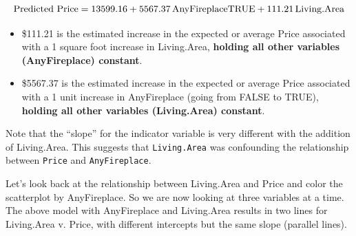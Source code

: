 \documentclass[
]{book}
\newenvironment{Shaded}{\begin{snugshade}}{\end{snugshade}}
\newcommand{\DataTypeTok}[1]{\textcolor[rgb]{0.13,0.29,0.53}{#1}}
\newcommand{\DecValTok}[1]{\textcolor[rgb]{0.00,0.00,0.81}{#1}}
\newcommand{\FloatTok}[1]{\textcolor[rgb]{0.00,0.00,0.81}{#1}}
\newcommand{\KeywordTok}[1]{\textcolor[rgb]{0.13,0.29,0.53}{\textbf{#1}}}
\newcommand{\NormalTok}[1]{#1}
\newcommand{\OperatorTok}[1]{\textcolor[rgb]{0.81,0.36,0.00}{\textbf{#1}}}
\newcommand{\StringTok}[1]{\textcolor[rgb]{0.31,0.60,0.02}{#1}}
\begin{document}
\[\hbox{Predicted Price} = 13599.16 + 5567.37\,\hbox{AnyFireplaceTRUE} + 111.21\,\hbox{Living.Area}\]

\begin{itemize}
\item
  \$111.21 is the estimated increase in the expected or average Price associated with a 1 square foot increase in Living.Area, \textbf{holding all other variables (AnyFireplace) constant}.
\item
  \$5567.37 is the estimated increase in the expected or average Price associated with a 1 unit increase in AnyFireplace (going from FALSE to TRUE), \textbf{holding all other variables (Living.Area) constant}.
\end{itemize}

Note that the ``slope'' for the indicator variable is very different with the addition of Living.Area. This suggests that \texttt{Living.Area} was confounding the relationship between \texttt{Price} and \texttt{AnyFireplace}.

Let's look back at the relationship between Living.Area and Price and color the scatterplot by AnyFireplace. So we are now looking at three variables at a time. The above model with AnyFireplace and Living.Area results in two lines for Living.Area v. Price, with different intercepts but the same slope (parallel lines).

\begin{Shaded}
\end{Shaded}
\end{document}
